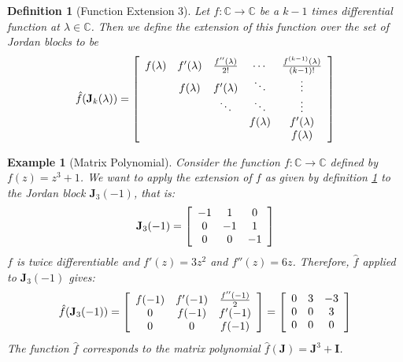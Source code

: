 \documentclass[a4paper,10pt,oneside]{book}
\newtheorem{example}{Example}
\newtheorem{definition}{Definition}
\begin{document}
\begin{definition}[Function Extension 3]\label{def:functionExtension3}
 Let $f:\mathbb{C}\to\mathbb{C}$ be a $k-1$ times differential function at $\lambda\in\mathbb{C}$. Then we define the extension of this function over the set of Jordan blocks to be 
\begin{equation}\label{eqn:jordanExt}
 \hat{f}(\mathbf{J}_k(\lambda)) = \left[ {\begin{array}{*{5}c}
 f(\lambda) & f'(\lambda) & \frac{f''(\lambda)}{2!} & \cdots & \frac{f^{(k-1)}(\lambda)}{(k-1)!} \\
 & f(\lambda) & f'(\lambda) & \ddots & \vdots \\
 && \ddots & \ddots & \vdots \\
 &&& f(\lambda) & f'(\lambda)\\
 &&&& f(\lambda)
 \end{array} } \right]
\end{equation}
\end{definition}
\begin{example}[Matrix Polynomial]
 Consider the function $f:\mathbb{C}\to\mathbb{C}$ defined by $f(z)=z^3+1$. We want to apply the extension of $f$ as given by definition \ref{def:functionExtension3} to the Jordan block $\mathbf{J}_3(-1)$, that is:
\begin{equation}
 \mathbf{J}_3(-1) = \left[ {\begin{array}{*{3}c}
 -1 & 1 & 0\\ 0 & -1 & 1\\ 0 & 0 & -1
 \end{array} } \right]
\end{equation}
$f$ is twice differentiable and $f'(z)=3z^2$ and $f''(z)=6z$. Therefore, $\hat{f}$ applied to $\mathbf{J}_3(-1)$ gives:
\begin{equation}
 \hat{f}(\mathbf{J}_3(-1)) = \left[ {\begin{array}{*{3}c}
 f(-1) & f'(-1) & \frac{f''(-1)}{2}\\ 0 & f(-1) & f'(-1)\\ 0 & 0 & f(-1)
 \end{array} } \right]=
\left[ {\begin{array}{*{3}c}
 0 & 3 & -3\\ 0 & 0 & 3\\ 0 & 0 & 0
 \end{array} } \right]
\end{equation}
The function $\hat{f}$ corresponds to the matrix polynomial $\hat{f}(\mathbf{J})=\mathbf{J}^3+\mathbf{I}$.
\end{example}
\end{document}
